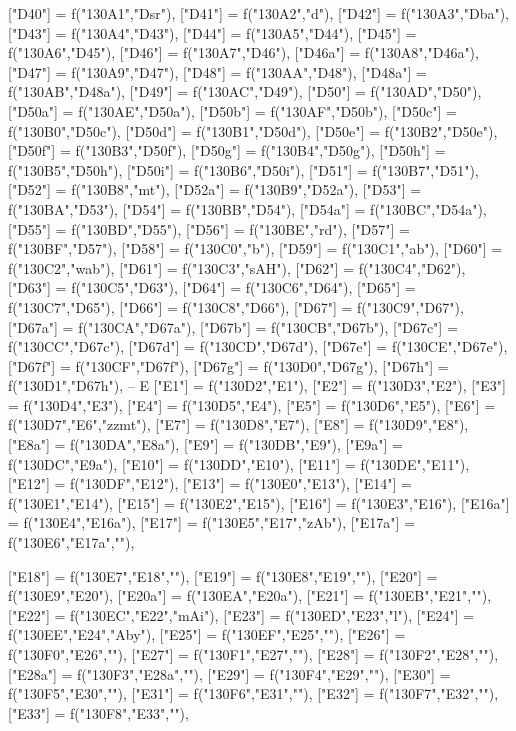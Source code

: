 \documentclass{article}
\begin{document}
\begin{luacode*}
{	["D40"] 		= f("130A1","Dsr"),
	["D41"] 		= f("130A2","d"),
	["D42"] 		= f("130A3","Dba"),
	["D43"] 		= f("130A4","D43"),
	["D44"] 		= f("130A5","D44"),
	["D45"] 		= f("130A6","D45"),
	["D46"] 		= f("130A7","D46"),
	["D46a"] 		= f("130A8","D46a"),
	["D47"] 		= f("130A9","D47"),
	["D48"] 		= f("130AA","D48"),
	["D48a"] 		= f("130AB","D48a"),
	["D49"] 		= f("130AC","D49"),
	["D50"] 		= f("130AD","D50"),
	["D50a"] 		= f("130AE","D50a"),
	["D50b"] 		= f("130AF","D50b"),
	["D50c"] 		= f("130B0","D50c"),
	["D50d"] 		= f("130B1","D50d"),
	["D50e"] 		= f("130B2","D50e"),
	["D50f"] 		= f("130B3","D50f"),
	["D50g"] 		= f("130B4","D50g"),
	["D50h"] 		= f("130B5","D50h"),
	["D50i"] 		= f("130B6","D50i"),
	["D51"] 		= f("130B7","D51"),
	["D52"] 		= f("130B8","mt"),
	["D52a"] 		= f("130B9","D52a"),
	["D53"] 		= f("130BA","D53"),
	["D54"] 		= f("130BB","D54"),
	["D54a"] 		= f("130BC","D54a"),
	["D55"] 		= f("130BD","D55"),
	["D56"] 		= f("130BE","rd"),
	["D57"] 		= f("130BF","D57"),
	["D58"] 		= f("130C0","b"),
	["D59"] 		= f("130C1","ab"),
	["D60"] 		= f("130C2","wab"),
	["D61"] 		= f("130C3","sAH"),
	["D62"] 		= f("130C4","D62"),
	["D63"] 		= f("130C5","D63"),
	["D64"] 		= f("130C6","D64"),
	["D65"] 		= f("130C7","D65"),
	["D66"] 		= f("130C8","D66"),
	["D67"] 		= f("130C9","D67"),
	["D67a"] 		= f("130CA","D67a"),
	["D67b"] 		= f("130CB","D67b"),
	["D67c"] 		= f("130CC","D67c"),
	["D67d"] 		= f("130CD","D67d"),
	["D67e"] 		= f("130CE","D67e"),
	["D67f"] 		= f("130CF","D67f"),
	["D67g"] 		= f("130D0","D67g"),
	["D67h"] 		= f("130D1","D67h"),
-- E 
   ["E1"] 		= f("130D2","E1"),
   ["E2"] 		= f("130D3","E2"),
   ["E3"] 		= f("130D4","E3"),
   ["E4"] 		= f("130D5","E4"),
   ["E5"] 		= f("130D6","E5"),
	["E6"] 		= f("130D7","E6","zzmt"),
   ["E7"] 		= f("130D8","E7"),
   ["E8"] 		= f("130D9","E8"),
   ["E8a"] 		= f("130DA","E8a"),
   ["E9"] 		= f("130DB","E9"),
   ["E9a"] 		= f("130DC","E9a"),
   ["E10"] 		= f("130DD","E10"),
	["E11"] 		= f("130DE","E11"),
	["E12"] 		= f("130DF","E12"),
	["E13"] 		= f("130E0","E13"),
	["E14"] 		= f("130E1","E14"),
	["E15"] 		= f("130E2","E15"),
	["E16"] 		= f("130E3","E16"),
	["E16a"] 		= f("130E4","E16a"),
	["E17"] 		= f("130E5","E17","zAb"),
	["E17a"] 		= f("130E6","E17a",""),

	["E18"] 		= f("130E7","E18",""),
	["E19"] 		= f("130E8","E19",""),
	["E20"] 		= f("130E9","E20"),
	["E20a"] 		= f("130EA","E20a"),
	["E21"] 		= f("130EB","E21",""),
	["E22"] 		= f("130EC","E22","mAi"),
	["E23"] 		= f("130ED","E23","l"),
	["E24"] 		= f("130EE","E24","Aby"),
	["E25"] 		= f("130EF","E25",""),
	["E26"] 		= f("130F0","E26",""),
	["E27"] 		= f("130F1","E27",""),
	["E28"] 		= f("130F2","E28",""),
	["E28a"] 		= f("130F3","E28a",""),
	["E29"] 		= f("130F4","E29",""),
	["E30"] 		= f("130F5","E30",""),
	["E31"] 		= f("130F6","E31",""),
	["E32"] 		= f("130F7","E32",""),
	["E33"] 		= f("130F8","E33",""),

}
\end{luacode*}
\end{document}

